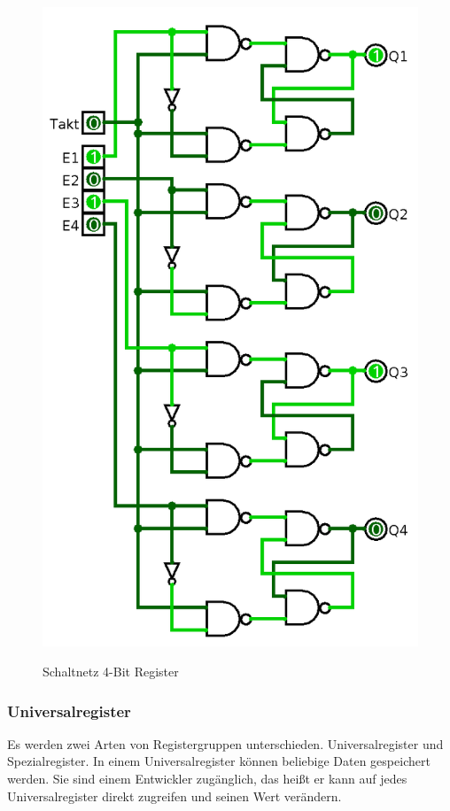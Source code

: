 \documentclass[12pt]{article}
\begin{document}
\newpage
\label{page:4bitreg}
\begin{figure}[!htb]
\centering
\caption{Schaltnetz 4-Bit Register}
\includegraphics[scale=0.35]{4bitreg}
\centering
\label{fig:4bitreg}
\end{figure}
\newpage


\subsubsection{Universalregister}
Es werden zwei Arten von Registergruppen unterschieden. Universalregister und Spezialregister. In einem Universalregister können beliebige Daten gespeichert werden. Sie sind einem Entwickler zugänglich, das heißt er kann auf jedes Universalregister direkt zugreifen und seinen Wert verändern. 
\end{document}

